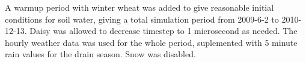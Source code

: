 \documentclass[a4paper]{article}
\begin{document}
A warmup period with winter wheat was added to give reasonable initial
conditions for soil water, giving a total simulation period from
2009-6-2 to 2010-12-13.  Daisy was allowed to decrease timestep to 1
microsecond as needed.  The hourly weather data was used for the whole
period, suplemented with 5 minute rain values for the drain season.
Snow was disabled.

\end{document}
